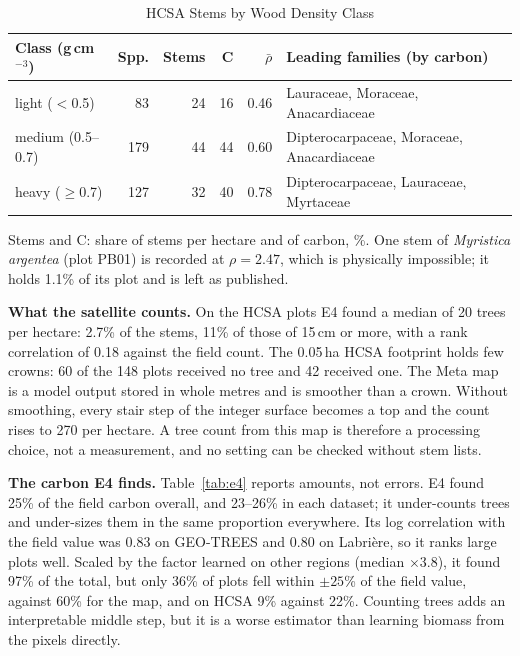\documentclass[conference,a4paper]{IEEEtran}
\begin{document}
\begin{table}[t]
\centering
\caption{HCSA Stems by Wood Density Class}
\label{tab:wclass}
\scriptsize
\setlength{\tabcolsep}{2.5pt}
\begin{tabularx}{\columnwidth}{@{}l r r r r X@{}}
\toprule
\textbf{Class (g\,cm$^{-3}$)} & \textbf{Spp.} & \textbf{Stems} & \textbf{C} & $\bar\rho$ & \textbf{Leading families (by carbon)}\\
\midrule
light ($<$0.5) & 83 & 24 & 16 & 0.46 & Lauraceae, Moraceae, Anacardiaceae\\
medium (0.5--0.7) & 179 & 44 & 44 & 0.60 & Dipterocarpaceae, Moraceae, Anacardiaceae\\
heavy ($\ge$0.7) & 127 & 32 & 40 & 0.78 & Dipterocarpaceae, Lauraceae, Myrtaceae\\
\bottomrule
\end{tabularx}

\vspace{2pt}
{\scriptsize Stems and C: share of stems per hectare and of carbon, \%. One stem of \textit{Myristica argentea} (plot PB01) is recorded at $\rho=2.47$, which is physically impossible; it holds 1.1\% of its plot and is left as published.\par}
\end{table}

\textbf{What the satellite counts.} On the HCSA plots E4 found a median of 20 trees per hectare: 2.7\% of the stems, 11\% of those of 15\,cm or more, with a rank correlation of 0.18 against the field count. The 0.05\,ha HCSA footprint holds few crowns: 60 of the 148 plots received no tree and 42 received one. The Meta map is a model output stored in whole metres and is smoother than a crown. Without smoothing, every stair step of the integer surface becomes a top and the count rises to 270 per hectare. A tree count from this map is therefore a processing choice, not a measurement, and no setting can be checked without stem lists.

\textbf{The carbon E4 finds.} Table~\ref{tab:e4} reports amounts, not errors. E4 found 25\% of the field carbon overall, and 23--26\% in each dataset; it under-counts trees and under-sizes them in the same proportion everywhere. Its log correlation with the field value was 0.83 on GEO-TREES and 0.80 on Labri\`ere, so it ranks large plots well. Scaled by the factor learned on other regions (median $\times$3.8), it found 97\% of the total, but only 36\% of plots fell within $\pm25$\% of the field value, against 60\% for the map, and on HCSA 9\% against 22\%. Counting trees adds an interpretable middle step, but it is a worse estimator than learning biomass from the pixels directly.
\end{document}
